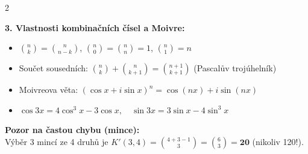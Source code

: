 \documentclass[9pt,a4paper]{article}
\begin{document}
\begin{tcolorbox}[secbox,title=OKRUHY 24--25: KOMBINATORIKA A BINOMICKÁ VĚTA]
\begin{multicols}{2}
\columnbreak

\textbf{3. Vlastnosti kombinačních čísel a Moivre:}
\begin{itemize}
  \item $\binom{n}{k} = \binom{n}{n-k}$, \quad $\binom{n}{0} = \binom{n}{n} = 1$, \quad $\binom{n}{1} = n$
  \item Součet sousedních: $\binom{n}{k} + \binom{n}{k+1} = \binom{n+1}{k+1}$ (Pascalův trojúhelník)
  \item Moivreova věta: $(\cos x + i \sin x)^n = \cos(nx) + i \sin(nx)$
  \item $\cos 3x = 4\cos^3 x - 3\cos x, \quad \sin 3x = 3\sin x - 4\sin^3 x$
\end{itemize}

\begin{tcolorbox}[alertbox]
\textbf{Pozor na častou chybu (mince):}\\
Výběr 3 mincí ze 4 druhů je $K'(3, 4) = \binom{4+3-1}{3} = \binom{6}{3} = \mathbf{20}$ (nikoliv 120!).
\end{tcolorbox}

\end{multicols}
\end{tcolorbox}
\end{document}

